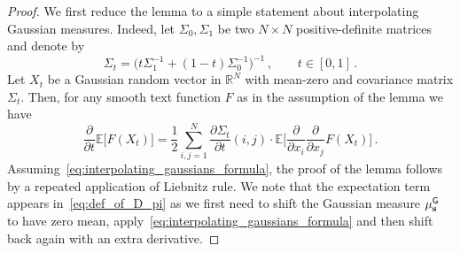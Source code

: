 \documentclass[11pt]{article}
\theoremstyle{definition}
\theoremstyle{remark}
\numberwithin{theorem}{section}
\newcommand{\bR}{\mathbb R}
\newcommand{\bE}{\mathbb E}
\begin{document}
    \begin{proof}
        We first reduce the lemma to a simple statement about interpolating Gaussian measures. Indeed, let $\Sigma_0, \Sigma_1$ be two $N\times N$ positive-definite matrices and denote by
        \[
        \Sigma_t = \big(t\Sigma_1^{-1} + (1-t)\Sigma_0^{-1}\big)^{-1} \, , \qquad t\in [0,1]\, .
        \]
        Let $X_t$ be a Gaussian random vector in $\bR^N$ with mean-zero and covariance matrix $\Sigma_t$. Then, for any smooth text function $F$ as in the assumption of the lemma we have
        \begin{equation} \label{eq:interpolating_gaussians_formula}
            \frac{\partial}{ \partial t} \bE\big[F(X_t) \big] = \frac{1}{2} \sum_{i,j=1}^{N} \frac{\partial \Sigma_t}{\partial t} (i,j) \cdot \bE\Big[ \frac{\partial}{\partial x_i} \frac{\partial}{\partial x_j} F(X_t) \Big] \, .
        \end{equation}
        Assuming~\eqref{eq:interpolating_gaussians_formula}, the proof of the lemma follows by a repeated application of Liebnitz rule. We note that the expectation term appears in~\eqref{eq:def_of_D_pi} as we first need to shift the Gaussian measure $\mu_{\mathbf{s}}^{\sf G}$ to have zero mean, apply~\eqref{eq:interpolating_gaussians_formula} and then shift back again with an extra derivative. 


\end{proof}
\end{document}
